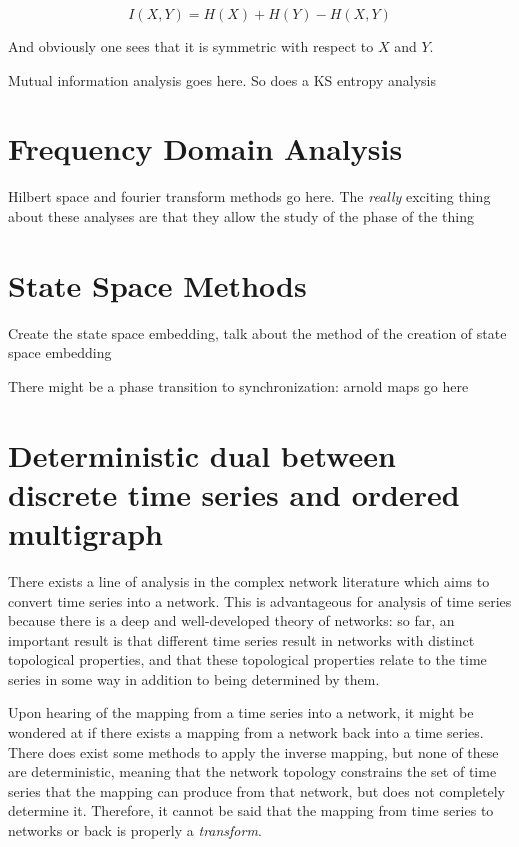 \documentclass[12pt]{article}
\begin{document}
$$I(X, Y) = H(X) + H(Y) - H(X, Y)$$

And obviously one sees that it is symmetric with respect to $X$ and $Y$.


Mutual information analysis goes here. So does a KS entropy analysis

\section{Frequency Domain Analysis}
Hilbert space and fourier transform methods go here. The \emph{really} exciting thing about these analyses are that they allow the study of the phase of the thing


\section{State Space Methods}

Create the state space embedding, talk about the method of the creation of state space embedding

There might be a phase transition to synchronization: arnold maps go here

\section{Deterministic dual between discrete time series and ordered multigraph}

There exists a line of analysis in the complex network literature which aims to convert time series into a network. This is advantageous for analysis of time series because there is a deep and well-developed theory of networks: so far, an important result is that different time series result in networks with distinct topological properties, and that these topological properties relate to the time series in some way in addition to being determined by them. %


Upon hearing of the mapping from a time series into a network, it might be wondered at if there exists a mapping from a network back into a time series. There does exist some methods to apply the inverse mapping, but none of these are deterministic, meaning that the network topology constrains the set of time series that the mapping can produce from that network, but does not completely determine it. Therefore, it cannot be said that the mapping from time series to networks or back is properly a \emph{transform}.%
\end{document}
